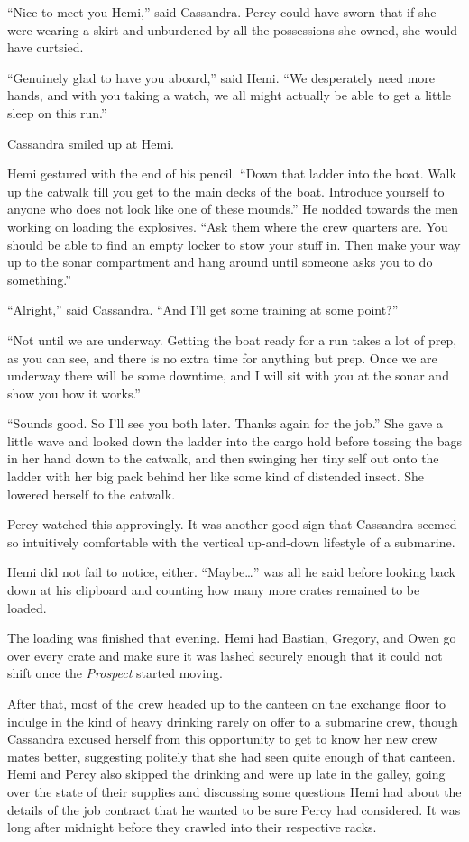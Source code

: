 \documentclass[
]{scrbook}
\begin{document}
``Nice to meet you Hemi,'' said Cassandra. Percy could have sworn that
if she were wearing a skirt and unburdened by all the possessions she
owned, she would have curtsied.

``Genuinely glad to have you aboard,'' said Hemi. ``We desperately need
more hands, and with you taking a watch, we all might actually be able
to get a little sleep on this run.''

Cassandra smiled up at Hemi.

Hemi gestured with the end of his pencil. ``Down that ladder into the
boat. Walk up the catwalk till you get to the main decks of the boat.
Introduce yourself to anyone who does not look like one of these
mounds.'' He nodded towards the men working on loading the explosives.
``Ask them where the crew quarters are. You should be able to find an
empty locker to stow your stuff in. Then make your way up to the sonar
compartment and hang around until someone asks you to do something.''

``Alright,'' said Cassandra. ``And I'll get some training at some
point?''

``Not until we are underway. Getting the boat ready for a run takes a
lot of prep, as you can see, and there is no extra time for anything but
prep. Once we are underway there will be some downtime, and I will sit
with you at the sonar and show you how it works.''

``Sounds good. So I'll see you both later. Thanks again for the job.''
She gave a little wave and looked down the ladder into the cargo hold
before tossing the bags in her hand down to the catwalk, and then
swinging her tiny self out onto the ladder with her big pack behind her
like some kind of distended insect. She lowered herself to the catwalk.

Percy watched this approvingly. It was another good sign that Cassandra
seemed so intuitively comfortable with the vertical up-and-down
lifestyle of a submarine.

Hemi did not fail to notice, either. ``Maybe\ldots{}'' was all he said
before looking back down at his clipboard and counting how many more
crates remained to be loaded.

\bigskip

The loading was finished that evening. Hemi had Bastian, Gregory, and
Owen go over every crate and make sure it was lashed securely enough
that it could not shift once the \emph{Prospect} started moving.

After that, most of the crew headed up to the canteen on the exchange
floor to indulge in the kind of heavy drinking rarely on offer to a
submarine crew, though Cassandra excused herself from this opportunity
to get to know her new crew mates better, suggesting politely that she
had seen quite enough of that canteen. Hemi and Percy also skipped the
drinking and were up late in the galley, going over the state of their
supplies and discussing some questions Hemi had about the details of the
job contract that he wanted to be sure Percy had considered. It was long
after midnight before they crawled into their respective racks.
\end{document}
